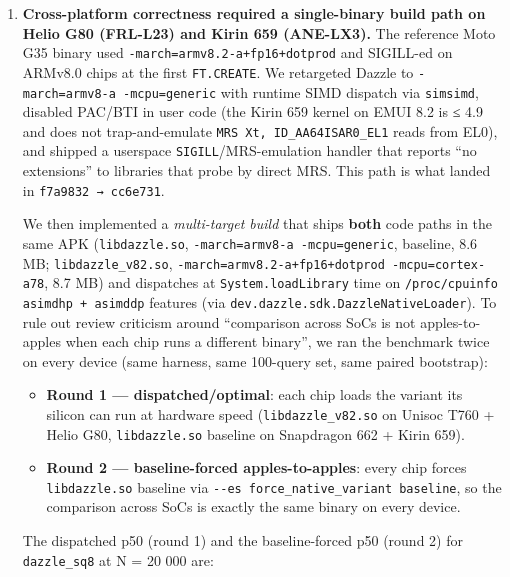 \begin{enumerate}
\def\labelenumi{\arabic{enumi}.}
\item
  \textbf{Cross-platform correctness required a single-binary build path on
  Helio G80 (FRL-L23) and Kirin 659 (ANE-LX3).} The reference Moto G35 binary
  used \texttt{-march=armv8.2-a+fp16+dotprod} and SIGILL-ed on ARMv8.0 chips at
  the first \texttt{FT.CREATE}. We retargeted Dazzle to
  \texttt{-march=armv8-a\ -mcpu=generic} with runtime SIMD dispatch via
  \texttt{simsimd}, disabled PAC/BTI in user code (the Kirin 659 kernel on EMUI
  8.2 is ≤ 4.9 and does not trap-and-emulate
  \texttt{MRS\ Xt,\ ID\_AA64ISAR0\_EL1} reads from EL0), and shipped a userspace
  \texttt{SIGILL}/MRS-emulation handler that reports ``no extensions'' to
  libraries that probe by direct MRS. This path is what landed in
  \texttt{f7a9832\ →\ cc6e731}.

  We then implemented a \emph{multi-target build} that ships \textbf{both} code
  paths in the same APK (\texttt{libdazzle.so},
  \texttt{-march=armv8-a\ -mcpu=generic}, baseline, 8.6 MB;
  \texttt{libdazzle\_v82.so},
  \texttt{-march=armv8.2-a+fp16+dotprod\ -mcpu=cortex-a78}, 8.7 MB) and
  dispatches at \texttt{System.loadLibrary} time on \texttt{/proc/cpuinfo}
  \texttt{asimdhp\ +\ asimddp} features (via
  \texttt{dev.dazzle.sdk.DazzleNativeLoader}). To rule out review criticism
  around ``comparison across SoCs is not apples-to- apples when each chip runs a
  different binary'', we ran the benchmark twice on every device (same harness,
  same 100-query set, same paired bootstrap):

  \begin{itemize}
  \tightlist
  \item
    \textbf{Round 1 --- dispatched/optimal}: each chip loads the variant its
    silicon can run at hardware speed (\texttt{libdazzle\_v82.so} on Unisoc T760
    + Helio G80, \texttt{libdazzle.so} baseline on Snapdragon 662 + Kirin 659).
  \item
    \textbf{Round 2 --- baseline-forced apples-to-apples}: every chip forces
    \texttt{libdazzle.so} baseline via
    \texttt{-\/-es\ force\_native\_variant\ baseline}, so the comparison across
    SoCs is exactly the same binary on every device.
  \end{itemize}

  The dispatched p50 (round 1) and the baseline-forced p50 (round 2) for
  \texttt{dazzle\_sq8} at N = 20 000 are:


\end{enumerate}
